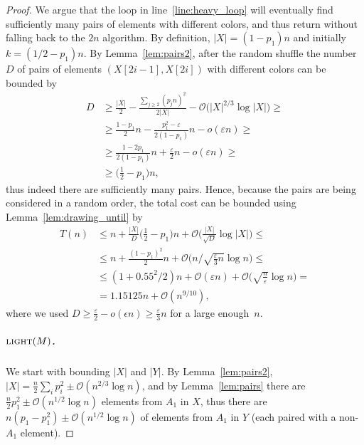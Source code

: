 \documentclass{article}[11pt,a4paper]
\newcommand{\bigo}{\mathcal{O}}
\begin{document}
\begin{proof}
We argue that the loop in line~\ref{line:heavy_loop} will eventually find sufficiently many
pairs of elements with different colors, and thus return without falling back to the $2n$ algorithm.
By definition, $|X| = (1-p_1)n$ and initially $k=(1/2-p_1)n$. By Lemma~\ref{lem:pairs2},
after the random shuffle the number $D$ of pairs of elements $(X[2i-1],X[2i])$ with different colors
can be bounded by
\begin{align*}
D &\ge \frac{|X|}{2} - \frac{\sum_{j\geq 2}(p_j n)^2}{2|X|} - \bigo\bigl(|X|^{2/3} \log |X|\bigr) \ge \\
&\ge \frac{1-p_1}2 n - \frac{p_1^2-\varepsilon}{2(1-p_1)}n - o(\varepsilon n) \ge \\
&\ge \frac{1-2p_1}{2(1-p_1)} n + \frac{\varepsilon}{2}n - o(\varepsilon n)\ge \\
&\ge \bigl(\tfrac12 - p_1\bigr)n,
\end{align*}
thus indeed there are sufficiently many pairs. Hence, because the pairs are being considered in
a random order, the total cost can be bounded using Lemma~\ref{lem:drawing_until} by
\begin{align*}
T(n) &\le n+\frac{|X|}{D} \biggl(\frac12-p_1\biggr)n  +\bigo\biggl(\frac{|X|}{\sqrt{D}} \log |X|\biggr) \le \\
&\le  n + \frac{(1-p_1)^2}{2}n + \bigo\biggl(n / \sqrt{\frac{\varepsilon}3 n} \log n\biggr) \le \\
&\le (1+0.55^2/2)n + \bigo(\varepsilon n) + \bigo\biggl(\sqrt{\frac{n}{\varepsilon}}\log n\biggr) = \\
& = 1.15125 n + \bigo(n^{9/10}),
\end{align*}
where we used $D \ge \frac{\varepsilon}{2}-o(\epsilon n) \ge \frac{\varepsilon}{3}n$
for a large enough~$n$.

\subparagraph*{{\normalfont $\textsc{light}(M)$}.}
We start with bounding $|X|$ and $|Y|$. By Lemma~\ref{lem:pairs2},
$|X| = \frac{n}{2} \sum_i p_i^2 \pm \bigo(n^{2/3} \log n)$, and by Lemma~\ref{lem:pairs} there
are $\frac{n}{2} p_1^2 \pm \bigo(n^{1/2} \log n)$ elements from $A_1$ in $X$, thus there are
$n (p_1 -p_1^2) \pm \bigo(n^{1/2} \log n)$ of elements from $A_1$ in $Y$ (each paired with
a non-$A_1$ element).


\end{proof}
\end{document}
